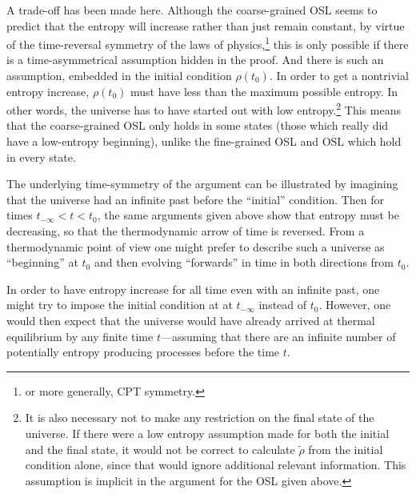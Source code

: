 \documentclass{article}
\begin{document}
A trade-off has been made here.  Although the coarse-grained OSL seems to predict that the entropy will increase rather than just remain constant, by virtue of the time-reversal symmetry of the laws of physics,\footnote{or more generally, CPT symmetry.} this is only possible if there is a time-asymmetrical assumption hidden in the proof.  And there is such an assumption, embedded in the initial condition $\rho(t_0)$.  In order to get a nontrivial entropy increase, $\rho(t_0)$ must have less than the maximum possible entropy.  In other words, the universe has to have started out with low entropy.\footnote{It is also necessary not to make any restriction on the final state of the universe.  If there were a low entropy assumption made for both the initial and the final state, it would not be correct to calculate $\tilde{\rho}$ from the initial condition alone, since that would ignore additional relevant information.  This assumption is implicit in the argument for the OSL given above.}  This means that the coarse-grained OSL only holds in some states (those which really did have a low-entropy beginning), unlike the fine-grained OSL and $\overline{\mathrm{OSL}}$ which hold in every state.

The underlying time-symmetry of the argument can be illustrated by imagining that the universe had an infinite past before the ``initial'' condition.  Then for times $t_{-\infty} < t < t_0$, the same arguments given above show that entropy must be decreasing, so that the thermodynamic arrow of time is reversed.  From a thermodynamic point of view one might prefer to describe such a universe as ``beginning'' at $t_0$ and then evolving ``forwards'' in time in both directions from $t_0$.  

In order to have entropy increase for all time even with an infinite past, one might try to impose the initial condition at at $t_{-\infty}$ instead of $t_0$.  However, one would then expect that the universe would have already arrived at thermal equilibrium by any finite time $t$---assuming that there are an infinite number of potentially entropy producing processes before the time $t$.
\end{document}
